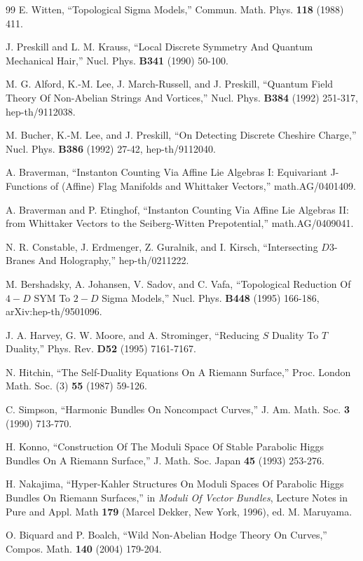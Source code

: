 \begin{thebibliography}{99}
 E. Witten, ``Topological Sigma
Models,'' Commun. Math. Phys. {\bf 118} (1988) 411.

 J. Preskill and
L. M. Krauss, ``Local Discrete Symmetry
And Quantum Mechanical Hair,''
Nucl. Phys. {\bf B341} (1990) 50-100.

 M. G. Alford, K.-M. Lee, J. March-Russell, and J. Preskill, ``Quantum Field Theory
Of Non-Abelian Strings And Vortices,'' Nucl. Phys. {\bf B384} (1992) 251-317, hep-th/9112038.

 M. Bucher, K.-M. Lee, and J. Preskill, ``On Detecting Discrete Cheshire Charge,''
Nucl. Phys. {\bf B386} (1992) 27-42, hep-th/9112040.

 A. Braverman, ``Instanton Counting Via Affine Lie Algebras I:
Equivariant J-Functions of (Affine) Flag Manifolds and Whittaker Vectors,'' math.AG/0401409.

 A. Braverman and P. Etinghof, ``Instanton Counting Via Affine Lie Algebras II:
from Whittaker Vectors to the Seiberg-Witten Prepotential,'' math.AG/0409041.

 N. R. Constable, J. Erdmenger, Z. Guralnik, and
I. Kirsch, ``Intersecting $D3$-Branes And Holography,''
hep-th/0211222.

 M. Bershadsky, A. Johansen, V.
Sadov, and C. Vafa, ``Topological Reduction Of $4-D$ SYM  To $2-D$
Sigma Models,'' Nucl. Phys. {\bf B448} (1995) 166-186,
arXiv:hep-th/9501096.

 J. A. Harvey, G. W. Moore, and A. Strominger, ``Reducing
$S$ Duality To $T$ Duality,'' Phys. Rev. {\bf D52} (1995) 7161-7167.

 N. Hitchin, ``The Self-Duality Equations On
A Riemann Surface,'' Proc. London Math. Soc. (3) {\bf 55} (1987)
59-126.

 C. Simpson,
``Harmonic Bundles On Noncompact Curves,'' J. Am. Math. Soc. {\bf
3} (1990) 713-770.

 H. Konno, ``Construction Of The Moduli Space Of
Stable Parabolic Higgs Bundles On A Riemann Surface,'' J. Math.
Soc. Japan {\bf 45} (1993) 253-276.

 H. Nakajima, ``Hyper-Kahler Structures On
Moduli Spaces Of Parabolic Higgs Bundles On Riemann Surfaces,''
in {\it Moduli Of Vector Bundles}, Lecture Notes in Pure and Appl. Math
{\bf 179} (Marcel Dekker, New York, 1996), ed. M. Maruyama.

 O. Biquard and P. Boalch, ``Wild Non-Abelian Hodge Theory On Curves,''
Compos. Math. {\bf 140} (2004) 179-204.


\end{thebibliography}
